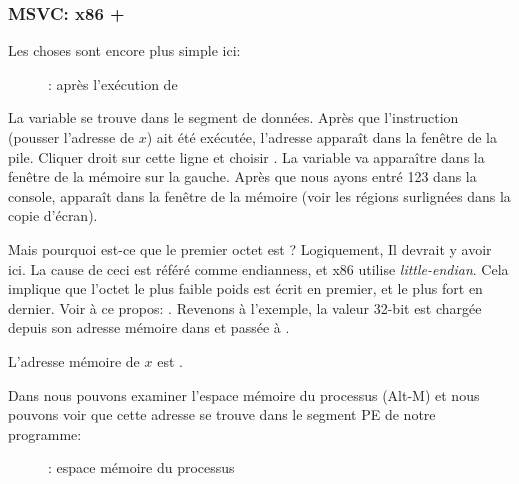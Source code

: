 \clearpage
\subsubsection{MSVC: x86 + \olly}
\myindex{\olly}

Les choses sont encore plus simple ici:

\begin{figure}[H]
\centering
{}
\caption{\olly: après l'exécution de \scanf}
\label{fig:scanf_ex2_olly_1}
\end{figure}

La variable se trouve dans le segment de données.
Après que l'instruction \PUSH (pousser l'adresse de $x$) ait été exécutée,
l'adresse apparaît dans la fenêtre de la pile. Cliquer droit sur cette ligne
et choisir . %
La variable va apparaître dans la fenêtre de la mémoire sur la gauche.
Après que nous ayons entré 123 dans la console,  apparaît dans la fenêtre
de la mémoire (voir les régions surlignées dans la copie d'écran).

Mais pourquoi est-ce que le premier octet est ?
Logiquement, Il devrait y avoir  ici.
La cause de ceci est référé comme \gls{endianness}, et x86 utilise \emph{little-endian}.
Cela implique que l'octet le plus faible poids est écrit en premier, et le plus fort
en dernier.
Voir à ce propos: .
Revenons à l'exemple, la valeur 32-bit est chargée depuis son adresse mémoire
dans \EAX et passée à \printf.

L'adresse mémoire de $x$ est .

\clearpage
Dans \olly nous pouvons examiner l'espace mémoire du processus  (Alt-M) et nous
pouvons voir que cette adresse se trouve dans le segment PE  de notre
programme:

\label{olly_memory_map_example}
\begin{figure}[H]
\centering
{}
\caption{\olly: espace mémoire du processus}
\label{fig:scanf_ex2_olly_2}
\end{figure}

